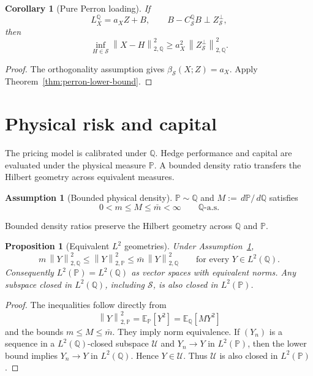 \documentclass[11pt,a4paper]{amsart}
\theoremstyle{plain}
\newtheorem{proposition}[theorem]{Proposition}
\newtheorem{corollary}[theorem]{Corollary}
\theoremstyle{definition}
\newtheorem{assumption}[theorem]{Assumption}
\theoremstyle{remark}
\newcommand{\PP}{\mathbb{P}}
\newcommand{\QQ}{\mathbb{Q}}
\newcommand{\EE}{\mathbb{E}}
\newcommand{\cS}{\mathcal{S}}
\newcommand{\cU}{\mathcal{U}}
\newcommand{\dd}{\,d}
\newcommand{\norm}[1]{\left\lVert #1\right\rVert}
\begin{document}
\begin{corollary}[Pure Perron loading]\label{cor:pure-perron-loading}
If
\[
        L_X^\QQ=a_X Z + B,
        \qquad
        B-C_{\cS}^{\QQ}B\perp Z_{\cS}^{\perp},
\]
then
\[
        \inf_{H\in\cS}\norm{X-H}_{2,\QQ}^2
        \ge
        a_X^2\,\norm{Z_{\cS}^{\perp}}_{2,\QQ}^2.
\]
\end{corollary}

\begin{proof}
The orthogonality assumption gives \(\beta_{\cS}(X;Z)=a_X\).  Apply
Theorem~\ref{thm:perron-lower-bound}.
\end{proof}

\section{Physical risk and capital}\label{sec:risk}

The pricing model is calibrated under \(\QQ\).  Hedge performance and capital are evaluated under
the physical measure \(\PP\).  A bounded density ratio transfers the Hilbert geometry across
equivalent measures.

\begin{assumption}[Bounded physical density]\label{ass:bounded-density}
\(\PP\sim\QQ\) and \(M:=\dd\PP/\dd\QQ\) satisfies
\[
        0<m\le M\le \bar m<\infty
        \qquad \QQ\text{-a.s.}
\]
\end{assumption}

Bounded density ratios preserve the Hilbert geometry across \(\QQ\) and \(\PP\).

\begin{proposition}[Equivalent \(L^2\) geometries]\label{prop:l2-equivalence}
Under Assumption~\ref{ass:bounded-density},
\[
        m\,\norm{Y}_{2,\QQ}^2
        \le
        \norm{Y}_{2,\PP}^2
        \le
        \bar m\,\norm{Y}_{2,\QQ}^2
        \qquad\text{for every }Y\in L^2(\QQ).
\]
Consequently \(L^2(\PP)=L^2(\QQ)\) as vector spaces with equivalent norms.  Any subspace closed in
\(L^2(\QQ)\), including \(\cS\), is also closed in \(L^2(\PP)\).
\end{proposition}

\begin{proof}
The inequalities follow directly from
\[
        \norm{Y}_{2,\PP}^2
        =
        \EE_\PP[Y^2]
        =
        \EE_\QQ[MY^2]
\]
and the bounds \(m\le M\le\bar m\).  They imply norm equivalence.  If \((Y_n)\) is a sequence in a
\(L^2(\QQ)\)-closed subspace \(\cU\) and \(Y_n\to Y\) in \(L^2(\PP)\), then the lower bound implies
\(Y_n\to Y\) in \(L^2(\QQ)\).  Hence \(Y\in\cU\).  Thus \(\cU\) is also closed in \(L^2(\PP)\).
\end{proof}
\end{document}

